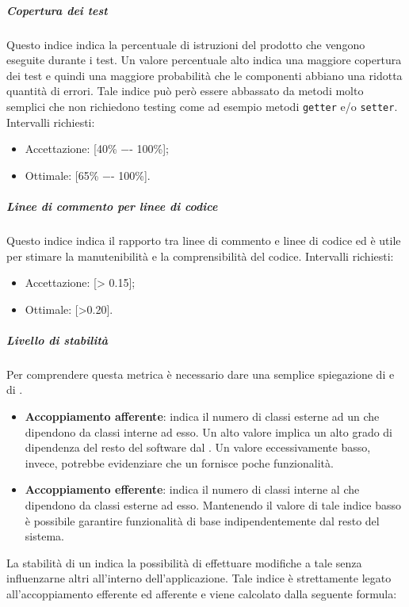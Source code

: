 \subparagraph{Copertura dei test}
Questo indice indica la percentuale di istruzioni del prodotto che vengono eseguite durante i test.
Un valore percentuale alto indica una maggiore copertura dei test e quindi una maggiore probabilità che le componenti abbiano una ridotta quantità di errori.
Tale indice può però essere abbassato da metodi molto semplici che non richiedono testing come ad esempio metodi \texttt{getter} e/o \texttt{setter}.
Intervalli richiesti:
\begin{itemize}
\item
Accettazione: [40\% −- 100\%];
\item
Ottimale: [65\% −- 100\%].
\end{itemize}

\subparagraph{Linee di commento per linee di codice}
Questo indice indica il rapporto tra linee di commento e linee di codice ed è utile per stimare la manutenibilità e la comprensibilità del codice. 
Intervalli richiesti:
\begin{itemize}
\item
Accettazione: [> 0.15];
\item
Ottimale: [>0.20].
\end{itemize}

\subparagraph{Livello di stabilità}
Per comprendere questa metrica è necessario dare una semplice spiegazione di  e di .
\begin{itemize}
\item
\textbf{Accoppiamento afferente}: indica il numero di classi esterne ad un  che dipendono da classi interne ad esso.
Un alto valore implica un alto grado di dipendenza del resto del software dal . Un valore eccessivamente basso, invece, potrebbe evidenziare che un  fornisce poche funzionalità.
\item
\textbf{Accoppiamento efferente}: indica il numero di classi interne al  che dipendono da classi esterne ad esso.
Mantenendo il valore di tale indice basso è possibile garantire funzionalità di base indipendentemente dal resto del sistema.
\end{itemize}

La stabilità di un  indica la possibilità di effettuare modifiche a tale  senza influenzarne altri all'interno dell'applicazione. Tale indice è strettamente legato all'accoppiamento efferente ed afferente e viene calcolato dalla seguente formula:

